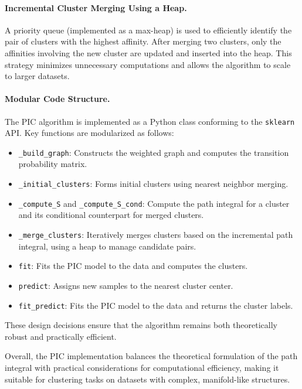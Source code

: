 \paragraph{Incremental Cluster Merging Using a Heap.}  
A priority queue (implemented as a max-heap) is used to efficiently identify the pair of clusters with the highest affinity. After merging two clusters, only the affinities involving the new cluster are updated and inserted into the heap. This strategy minimizes unnecessary computations and allows the algorithm to scale to larger datasets.

\paragraph{Modular Code Structure.}  
The PIC algorithm is implemented as a Python class conforming to the \texttt{sklearn} API. Key functions are modularized as follows:
\begin{itemize}
  \item \texttt{\_build\_graph}: Constructs the weighted graph and computes the transition probability matrix.
  \item \texttt{\_initial\_clusters}: Forms initial clusters using nearest neighbor merging.
  \item \texttt{\_compute\_S} and \texttt{\_compute\_S\_cond}: Compute the path integral for a cluster and its conditional counterpart for merged clusters.
  \item \texttt{\_merge\_clusters}: Iteratively merges clusters based on the incremental path integral, using a heap to manage candidate pairs.
  \item \texttt{fit}: Fits the PIC model to the data and computes the clusters.
  \item \texttt{predict}: Assigns new samples to the nearest cluster center.
  \item \texttt{fit\_predict}: Fits the PIC model to the data and returns the cluster labels.
\end{itemize}
These design decisions ensure that the algorithm remains both theoretically robust and practically efficient.

Overall, the PIC implementation balances the theoretical formulation of the path integral with practical considerations for computational efficiency, making it suitable for clustering tasks on datasets with complex, manifold-like structures.
